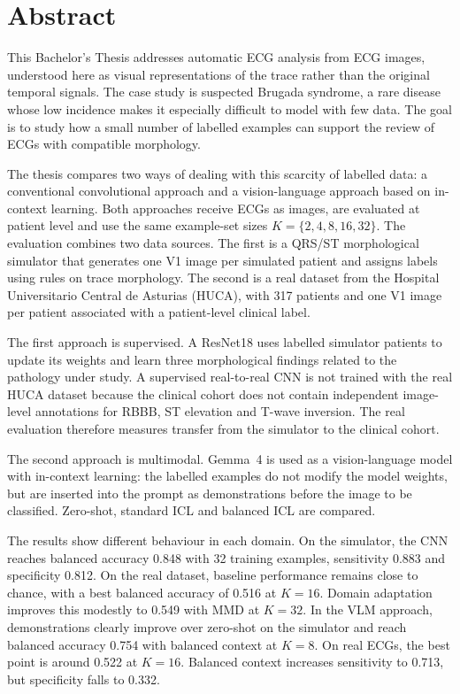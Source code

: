 \chapter*{Abstract}

This Bachelor's Thesis addresses automatic ECG analysis from ECG images, understood here as visual representations of the trace rather than the original temporal signals. The case study is suspected Brugada syndrome, a rare disease whose low incidence makes it especially difficult to model with few data. The goal is to study how a small number of labelled examples can support the review of ECGs with compatible morphology.

The thesis compares two ways of dealing with this scarcity of labelled data: a conventional convolutional approach and a vision-language approach based on in-context learning. Both approaches receive ECGs as images, are evaluated at patient level and use the same example-set sizes \(K=\{2,4,8,16,32\}\). The evaluation combines two data sources. The first is a QRS/ST morphological simulator that generates one V1 image per simulated patient and assigns labels using rules on trace morphology. The second is a real dataset from the Hospital Universitario Central de Asturias (HUCA), with 317 patients and one V1 image per patient associated with a patient-level clinical label.

The first approach is supervised. A ResNet18 uses labelled simulator patients to update its weights and learn three morphological findings related to the pathology under study. A supervised real-to-real CNN is not trained with the real HUCA dataset because the clinical cohort does not contain independent image-level annotations for RBBB, ST elevation and T-wave inversion. The real evaluation therefore measures transfer from the simulator to the clinical cohort.

The second approach is multimodal. Gemma~4 is used as a vision-language model with in-context learning: the labelled examples do not modify the model weights, but are inserted into the prompt as demonstrations before the image to be classified. Zero-shot, standard ICL and balanced ICL are compared.

The results show different behaviour in each domain. On the simulator, the CNN reaches balanced accuracy 0.848 with 32 training examples, sensitivity 0.883 and specificity 0.812. On the real dataset, baseline performance remains close to chance, with a best balanced accuracy of 0.516 at \(K=16\). Domain adaptation improves this modestly to 0.549 with MMD at \(K=32\). In the VLM approach, demonstrations clearly improve over zero-shot on the simulator and reach balanced accuracy 0.754 with balanced context at \(K=8\). On real ECGs, the best point is around 0.522 at \(K=16\). Balanced context increases sensitivity to 0.713, but specificity falls to 0.332.

